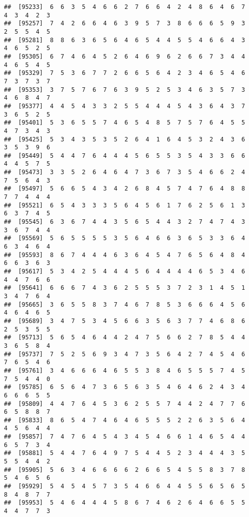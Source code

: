 \documentclass[
]{book}
\begin{document}
\begin{verbatim}
##  [95233]  6  6  3  5  4  6  6  2  7  6  6  4  2  4  8  6  4  6  7  4  3  4  2  3
##  [95257]  7  4  2  6  6  4  6  3  9  5  7  3  8  6  6  6  5  9  3  2  5  5  4  5
##  [95281]  8  8  6  3  6  5  6  4  6  5  4  4  5  5  4  6  6  4  3  4  6  5  2  5
##  [95305]  6  7  4  6  4  5  2  6  4  6  9  6  2  6  6  7  3  4  4  4  6  5  4  5
##  [95329]  7  5  3  6  7  7  2  6  6  5  6  4  2  3  4  6  5  4  6  7  3  7  3  7
##  [95353]  3  7  5  7  6  7  6  3  9  5  2  5  3  4  6  3  5  7  3  4  6  8  4  7
##  [95377]  4  4  5  4  3  3  2  5  5  4  4  4  5  4  3  6  4  3  7  3  6  5  2  5
##  [95401]  5  3  6  5  5  7  4  6  5  4  8  5  7  5  7  6  4  5  5  4  7  3  4  3
##  [95425]  5  3  4  3  5  3  5  2  6  4  1  6  4  5  3  2  4  3  6  3  5  3  9  6
##  [95449]  5  4  4  7  6  4  4  4  5  6  5  5  3  5  4  3  3  6  6  4  4  5  7  5
##  [95473]  3  3  5  2  6  4  6  4  7  3  6  7  3  5  4  6  6  2  4  7  5  6  4  3
##  [95497]  5  6  6  5  4  3  4  2  6  8  4  5  7  4  7  6  4  8  8  7  7  4  4  4
##  [95521]  6  5  4  3  3  3  5  6  4  5  6  1  7  6  2  5  6  1  3  6  3  7  4  5
##  [95545]  6  3  6  7  4  4  3  5  6  5  4  4  3  2  7  4  7  4  3  3  6  7  4  4
##  [95569]  5  6  5  5  5  5  3  5  6  4  6  6  3  6  5  3  3  6  4  6  3  4  6  4
##  [95593]  8  6  7  4  4  4  6  3  6  4  5  4  7  6  5  6  4  8  4  6  6  3  6  3
##  [95617]  5  3  4  2  5  4  4  4  5  6  4  4  4  4  6  5  3  4  6  4  4  7  6  6
##  [95641]  6  6  6  7  4  3  6  2  5  5  5  3  7  2  3  1  4  5  1  3  4  7  6  4
##  [95665]  3  6  5  5  8  3  7  4  6  7  8  5  3  6  6  6  4  5  6  4  6  4  6  5
##  [95689]  3  4  7  5  3  4  5  6  6  3  5  6  3  7  7  4  6  8  6  2  5  3  5  5
##  [95713]  5  6  5  4  6  4  4  2  4  7  5  6  6  2  7  8  5  4  4  3  6  5  8  4
##  [95737]  7  5  2  5  6  9  3  4  7  3  5  6  4  2  7  4  5  4  6  7  6  5  4  6
##  [95761]  3  4  6  6  6  4  6  5  5  3  8  4  6  5  5  5  7  4  5  7  5  4  4  0
##  [95785]  6  5  6  4  7  3  6  5  6  3  5  4  6  4  6  2  4  3  4  6  6  6  5  5
##  [95809]  4  4  7  6  4  5  3  6  2  5  5  7  4  4  2  4  7  7  6  6  5  8  8  7
##  [95833]  8  6  5  4  7  4  6  4  6  5  5  5  2  2  6  3  5  6  4  4  5  6  4  4
##  [95857]  7  4  7  6  4  5  4  3  4  5  4  6  6  1  4  6  5  4  4  6  5  7  3  4
##  [95881]  5  4  4  7  6  4  9  7  5  4  4  5  2  3  4  4  4  3  5  5  5  4  4  2
##  [95905]  5  6  3  4  6  6  6  6  2  6  6  5  4  5  5  8  3  7  8  5  4  6  5  6
##  [95929]  5  4  5  4  5  7  3  5  4  6  6  4  4  5  5  6  5  6  5  8  4  8  7  7
##  [95953]  5  4  6  4  4  4  5  8  6  7  4  6  2  6  4  6  6  5  5  4  4  7  7  3

\end{verbatim}
\end{document}
